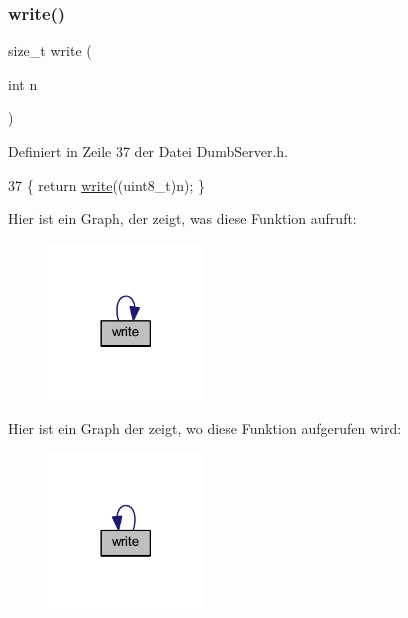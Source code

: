 \subsubsection{\texorpdfstring{write()}{write()}\hspace{0.1cm}{\footnotesize\ttfamily [6/6]}}
{\footnotesize\ttfamily size\+\_\+t write (\begin{DoxyParamCaption}\item[{int}]{n }\end{DoxyParamCaption})\hspace{0.3cm}{\ttfamily [inline]}}



Definiert in Zeile 37 der Datei Dumb\+Server.\+h.


\begin{DoxyCode}
37 \{ \textcolor{keywordflow}{return} \hyperlink{class_esp_server_a7c66fc8d559f4956d4ccea196299bca7}{write}((uint8\_t)n); \}
\end{DoxyCode}
Hier ist ein Graph, der zeigt, was diese Funktion aufruft\+:\nopagebreak
\begin{figure}[H]
\begin{center}
\leavevmode
\includegraphics[width=117pt]{class_esp_server_a22e7ab55e0aa268cff5b48e763429ec3_cgraph}
\end{center}
\end{figure}
Hier ist ein Graph der zeigt, wo diese Funktion aufgerufen wird\+:\nopagebreak
\begin{figure}[H]
\begin{center}
\leavevmode
\includegraphics[width=117pt]{class_esp_server_a22e7ab55e0aa268cff5b48e763429ec3_icgraph}
\end{center}
\end{figure}


